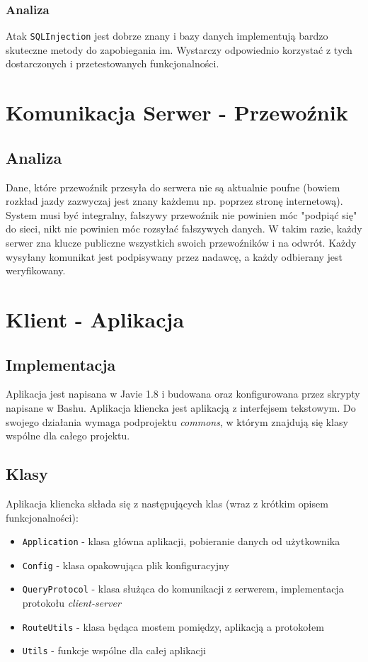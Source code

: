 \documentclass[pdftex,13pt,a4paper]{article}
\begin{document}
\subsubsection{Analiza}
Atak \texttt{SQLInjection} jest dobrze znany i bazy danych implementują bardzo skuteczne metody do zapobiegania im.
Wystarczy odpowiednio korzystać z tych dostarczonych i przetestowanych funkcjonalności.

\section{Komunikacja Serwer - Przewoźnik}

\subsection{Analiza}
Dane, które przewoźnik przesyła do serwera nie są aktualnie poufne (bowiem rozkład jazdy zazwyczaj jest znany każdemu np. poprzez stronę internetową).
System musi być integralny, fałszywy przewoźnik nie powinien móc "podpiąć się" do sieci, nikt nie powinien móc rozsyłać fałszywych danych.
W takim razie, każdy serwer zna klucze publiczne wszystkich swoich przewoźników i na odwrót.
Każdy wysyłany komunikat jest podpisywany przez nadawcę, a każdy odbierany jest weryfikowany.

\section{Klient - Aplikacja}

\subsection{Implementacja}

Aplikacja jest napisana w Javie 1.8 i budowana oraz konfigurowana przez skrypty napisane w Bashu. Aplikacja kliencka jest aplikacją z interfejsem tekstowym. Do swojego działania wymaga podprojektu \emph{commons}, w którym znajdują się klasy wspólne dla całego projektu.

\subsection{Klasy}
Aplikacja kliencka składa się z następujących klas (wraz z krótkim opisem funkcjonalności):
\begin{itemize}
\item \texttt{Application} - klasa główna aplikacji, pobieranie danych od użytkownika
\item \texttt{Config} - klasa opakowująca plik konfiguracyjny
\item \texttt{QueryProtocol} - klasa służąca do komunikacji z serwerem, implementacja protokołu \textit{client-server}
\item \texttt{RouteUtils} - klasa będąca mostem pomiędzy, aplikacją a protokołem
\item \texttt{Utils} - funkcje wspólne dla całej aplikacji
\end{itemize}
\end{document}

